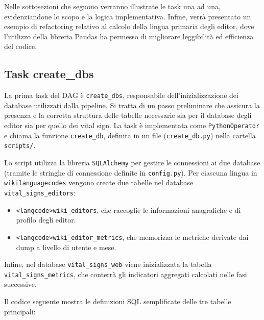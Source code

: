 Nelle sottosezioni che seguono verranno illustrate le task una ad una, evidenziandone lo scopo e la logica implementativa.
Infine, verrà presentato un esempio di refactoring relativo al calcolo della lingua primaria degli editor, dove l’utilizzo della libreria Pandas ha permesso di migliorare leggibilità ed efficienza del codice.
\subsection{Task create\_dbs}
\label{subsec:create_dbs}

La prima task del DAG è \texttt{create\_dbs}, responsabile dell’inizializzazione dei database utilizzati dalla pipeline. 
Si tratta di un passo preliminare che assicura la presenza e la corretta struttura delle tabelle necessarie sia per il database degli editor sia per quello dei vital sign. 
La task è implementata come \texttt{PythonOperator} e chiama la funzione \texttt{create\_db}, definita in un file (\texttt{create\_db.py}) nella cartella \texttt{scripts/}.

Lo script utilizza la libreria \texttt{SQLAlchemy} per gestire le connessioni ai due database (tramite le stringhe di connessione definite in \texttt{config.py}). 
Per ciascuna lingua in \texttt{wikilanguagecodes} vengono create due tabelle nel database \texttt{vital\_signs\_editors}:

\begin{itemize}
    \item \texttt{<langcode>wiki\_editors}, che raccoglie le informazioni anagrafiche e di profilo degli editor.
    \item \texttt{<langcode>wiki\_editor\_metrics}, che memorizza le metriche derivate dai dump a livello di utente e mese.
\end{itemize}

Infine, nel database \texttt{vital\_signs\_web} viene inizializzata la tabella \texttt{vital\_signs\_metrics}, che conterrà gli indicatori aggregati calcolati nelle fasi successive. 

Il codice seguente mostra le definizioni SQL semplificate delle tre tabelle principali:



